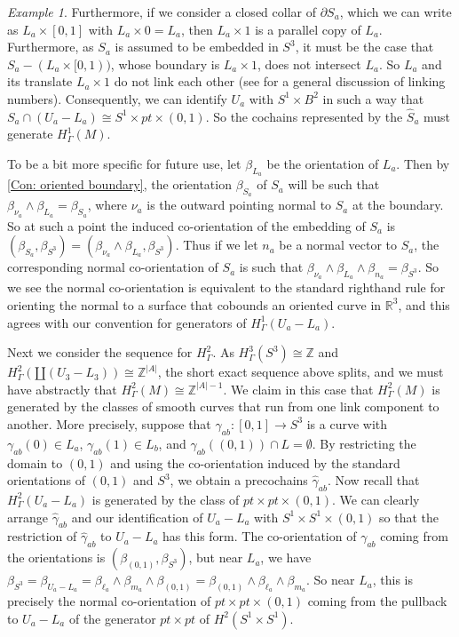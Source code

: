 \documentclass[12pt]{article}
\theoremstyle{plain}
\theoremstyle{definition}
\theoremstyle{remark}
\newtheorem{example}[theorem]{Example}
\newcommand{\Z}{\mathbb{Z}}
\newcommand{\R}{\mathbb{R}}
\newcommand{\bd}{\partial}
\begin{document}
\begin{example}
Furthermore, if we consider a closed collar of $\bd S_a$, which we can write as $L_a \times [0,1]$ with $L_a \times 0 = L_a$, then $L_a \times 1$ is a parallel copy of $L_a$.
Furthermore, as $S_a$ is assumed to be embedded in $S^3$, it must be the case that $S_a - (L_a \times [0,1))$, whose boundary is $L_a \times 1$, does not intersect $L_a$. So $L_a$ and its translate $L_a \times 1$ do not link each other (see \cite[Section 5.D]{Ro76} for a general discussion of linking numbers).
Consequently, we can identify $U_a$ with $S^1 \times B^2$ in such a way that $S_a \cap (U_a-L_a) \cong S^1 \times pt \times (0,1)$.
So the cochains represented by the $\hat S_a$ must generate $H^1_\Gamma(M)$.

To be a bit more specific for future use, let $\beta_{L_a}$ be the orientation of $L_a$. Then by \cref{Con: oriented boundary}, the orientation $\beta_{S_a}$ of $S_a$ will be such that $\beta_{\nu_a} \wedge \beta_{L_a} = \beta_{S_a}$, where $\nu_a$ is the outward pointing normal to $S_a$ at the boundary.
So at such a point the induced co-orientation of the embedding of $S_a$ is $(\beta_{S_a},\beta_{S^3}) = (\beta_{\nu_a} \wedge \beta_{L_a},\beta_{S^3})$.
Thus if we let $n_a$ be a normal vector to $S_a$, the corresponding normal co-orientation of $S_a$ is such that $\beta_{\nu_a} \wedge \beta_{L_a} \wedge \beta_{n_a} = \beta_{S^3}$.
So we see the normal co-orientation is equivalent to the standard righthand rule for orienting the normal to a surface that cobounds an oriented curve in $\R^3$, and this agrees with our convention for generators of $H^1_\Gamma(U_a-L_a)$.

Next we consider the sequence for $H^2_\Gamma$.
As $H^3_\Gamma(S^3) \cong \Z$ and $H^2_\Gamma(\amalg(U_3-L_3)) \cong \Z^{|A|}$, the short exact sequence above splits, and we must have abstractly that $H^2_\Gamma(M) \cong \Z^{|A|-1}$.
We claim in this case that $H^2_\Gamma(M)$ is generated by the classes of smooth curves that run from one link component to another.
More precisely, suppose that $\gamma_{ab} \colon [0,1] \to S^3$ is a curve with $\gamma_{ab}(0) \in L_a$, $\gamma_{ab}(1) \in L_b$, and $\gamma_{ab}((0,1)) \cap L = \emptyset$.
By restricting the domain to $(0,1)$ and using the co-orientation induced by the standard orientations of $(0,1)$ and $S^3$, we obtain a precochains $\hat \gamma_{ab}$.
Now recall that $H^2_\Gamma(U_a-L_a)$ is generated by the class of $pt \times pt \times (0,1)$.
We can clearly arrange $\hat \gamma_{ab}$ and our identification of $U_a - L_a$ with $S^1 \times S^1 \times (0,1)$ so that the restriction of $\hat \gamma_{ab}$ to $U_a - L_a$ has this form.
The co-orientation of $\gamma_{ab}$ coming from the orientations is $(\beta_{(0,1)},\beta_{S^3})$, but near $L_a$, we have $\beta_{S^3} = \beta_{U_a - L_a} = \beta_{\ell_a} \wedge \beta_{m_a} \wedge \beta_{(0,1)} = \beta_{(0,1)} \wedge \beta_{\ell_a} \wedge \beta_{m_a}$.
So near $L_a$, this is precisely the normal co-orientation of $pt \times pt \times (0,1)$ coming from the pullback to $U_a - L_a$ of the generator $pt \times pt$ of $H^2(S^1 \times S^1)$.




\end{example}
\end{document}
